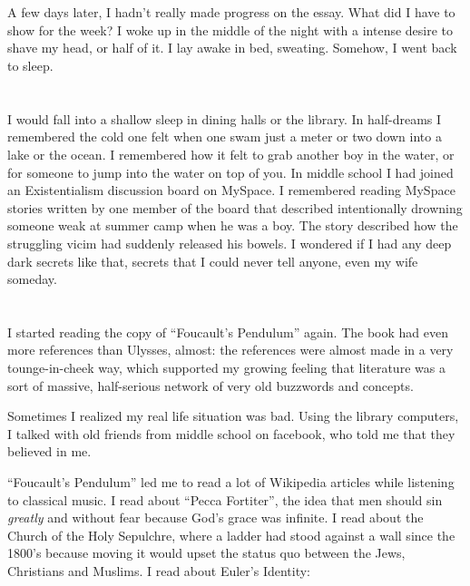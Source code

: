 \section{}

A few days later, I hadn't really made progress on the essay.  What did I have
to show for the week? I woke up in the middle of the night with a intense desire
to shave my head, or half of it.  I lay awake in bed, sweating.  Somehow, I went
back to sleep.

\section{}

I would fall into a shallow sleep in dining halls or the library.  In
half-dreams I remembered the cold one felt when one swam just a meter or two
down into a lake or the ocean.  I remembered how it felt to grab another boy in
the water, or for someone to jump into the water on top of you.  In middle
school I had joined an Existentialism discussion board on MySpace.  I remembered
reading MySpace stories written by one member of the board that described
intentionally drowning someone weak at summer camp when he was a boy.  The story
described how the struggling vicim had suddenly released his bowels.  I wondered
if I had any deep dark secrets like that, secrets that I could never tell
anyone, even my wife someday.


\section{}

I started reading the copy of ``Foucault's Pendulum'' again.  The book had even
more references than Ulysses, almost: the references were almost made in a very
tounge-in-cheek way, which supported my growing feeling that literature was a
sort of massive, half-serious network of very old buzzwords and concepts.

Sometimes I realized my real life situation was bad.  Using the library
computers, I talked with old friends from middle school on facebook, who told me
that they believed in me.  

``Foucault's Pendulum'' led me to read a lot of Wikipedia articles while
listening to classical music.  I read about ``Pecca Fortiter'', the idea that
men should sin \textit{greatly} and without fear because God's grace was
infinite.  I read about the Church of the Holy Sepulchre, where a ladder had
stood against a wall since the 1800's because moving it would upset the status
quo between the Jews, Christians and Muslims.  I read about Euler's Identity:

